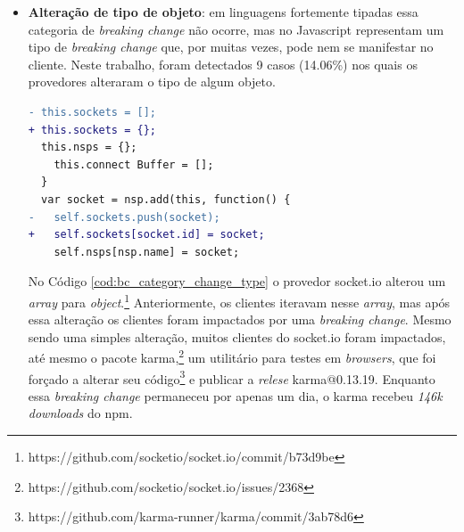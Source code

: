 \begin{itemize}
    A \textit{release} \textsf{escope@3.4} realizou uma alteração no seu código, conforme o Código \ref{cod:bc_category_incompatibles_providers}, mas que não reflete em um erro. Essa alteração impactou diretamente o pacote \textsf{babel-eslint}, mesmo o pacote \textsf{escope} não sendo um provedor direto do \textsf{babel-eslint} e não ter introduzido um erro.\footnote{https://github.com/estools/escope/issues/99\#issuecomment-178151491} Com isso, houve uma incompatibilidade entre os provedores e essa incompatibilidade precisou ser corrigida pelo \textsf{babel-eslint}. Essa \textit{breaking change} durou apenas um dia, mas durante esse período o \textsf{babel-eslint} foi descarregado \textit{80k} vezes do \textsf{npm}.

    \item \textbf{Alteração de tipo de objeto}: em linguagens fortemente tipadas essa categoria de \textit{breaking change} não ocorre, mas no \textsf{Javascript} representam um tipo de \textit{breaking change} que, por muitas vezes, pode nem se manifestar no cliente. Neste trabalho, foram detectados 9 casos (14.06\%) nos quais os provedores alteraram o tipo de algum objeto.
    \vspace{0.4cm}
    \begin{lstlisting}[numbers=none, language=diff, label=cod:bc_category_change_type, caption={Exemplo da categoria \textit{Alteração de tipo de objeto}}]
- this.sockets = [];
+ this.sockets = {};
  this.nsps = {};
    this.connect Buffer = [];
  }
  var socket = nsp.add(this, function() {
-   self.sockets.push(socket);
+   self.sockets[socket.id] = socket;
    self.nsps[nsp.name] = socket;
    \end{lstlisting}

    No Código \ref{cod:bc_category_change_type} o provedor \textsf{socket.io} alterou um \textit{array} para \textit{object}.\footnote{https://github.com/socketio/socket.io/commit/b73d9be} Anteriormente, os clientes iteravam nesse \textit{array}, mas após essa alteração os clientes foram impactados por uma \textit{breaking change}. Mesmo sendo uma simples alteração, muitos clientes do \textsf{socket.io} foram impactados, até mesmo o pacote \textsf{karma},\footnote{https://github.com/socketio/socket.io/issues/2368} um utilitário para testes em \textit{browsers}, que foi forçado a alterar seu código\footnote{https://github.com/karma-runner/karma/commit/3ab78d6} e publicar a \textit{relese} \textsf{karma@0.13.19}. Enquanto essa \textit{breaking change} permaneceu por apenas um dia, o \textsf{karma} recebeu \textit{146k downloads} do \textsf{npm}.


\end{itemize}
